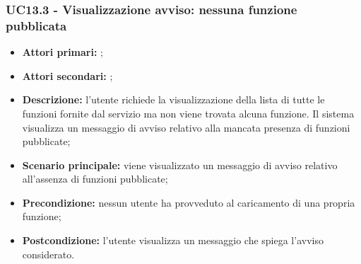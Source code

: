 \subsubsection{UC13.3 - Visualizzazione avviso: nessuna funzione pubblicata}
\begin{itemize}
	\item \textbf{Attori primari:} \ua{};
	\item \textbf{Attori secondari:} \re{};
	\item \textbf{Descrizione:} l’utente richiede la visualizzazione della lista di tutte le funzioni fornite dal servizio ma non viene trovata alcuna funzione. Il sistema visualizza un messaggio di avviso relativo alla mancata presenza di funzioni pubblicate; 
	\item \textbf{Scenario principale:} viene visualizzato un messaggio di avviso relativo all’assenza di funzioni pubblicate;
	\item \textbf{Precondizione:} nessun utente ha provveduto al caricamento di una propria funzione;
	\item \textbf{Postcondizione:}  l’utente visualizza un messaggio che spiega l’avviso considerato.
\end{itemize}